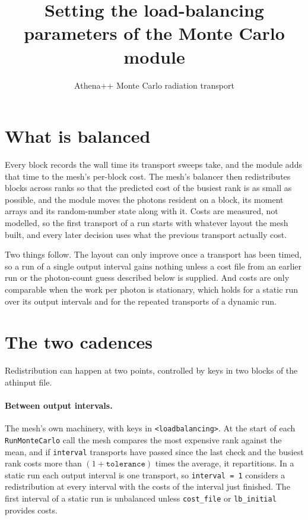 \documentclass[11pt]{article}
\title{Setting the load-balancing parameters of the Monte Carlo module}
\author{Athena++ Monte Carlo radiation transport}
\date{}
\newcommand{\key}[1]{\texttt{#1}}
\begin{document}
\sloppy
\maketitle

\section{What is balanced}

Every block records the wall time its transport sweeps take, and the module adds that
time to the mesh's per-block cost. The mesh's balancer then redistributes blocks across
ranks so that the predicted cost of the busiest rank is as small as possible, and the
module moves the photons resident on a block, its moment arrays and its random-number
state along with it. Costs are measured, not modelled, so the first transport of a run
starts with whatever layout the mesh built, and every later decision uses what the
previous transport actually cost.

Two things follow. The layout can only improve once a transport has been timed, so a
run of a single output interval gains nothing unless a cost file from an earlier run or
the photon-count guess described below is supplied. And costs are only comparable when
the work per photon is stationary, which holds for a static run over its output
intervals and for the repeated transports of a dynamic run.

\section{The two cadences}

Redistribution can happen at two points, controlled by keys in two blocks of the athinput file.

\paragraph{Between output intervals.}
The mesh's own machinery, with keys in \key{<loadbalancing>}. At the start of each
\key{RunMonteCarlo} call the mesh compares the most expensive rank against the mean, and
if \key{interval} transports have passed since the last check and the busiest rank costs
more than $(1+\key{tolerance})$ times the average, it repartitions. In a static run each
output interval is one transport, so \key{interval = 1} considers a redistribution at
every interval with the costs of the interval just finished. The first interval of a
static run is unbalanced unless \key{cost\_file} or \key{lb\_initial} provides costs.
\end{document}
